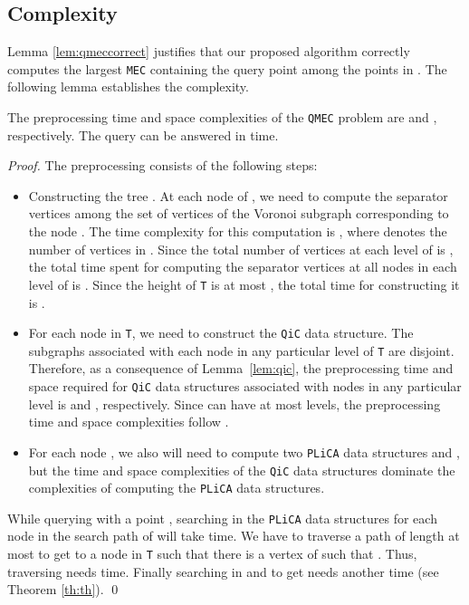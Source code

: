 \documentclass[12pt]{llncs}
\begin{document}
\subsection{Complexity}\label{cc}

Lemma \ref{lem:qmeccorrect} justifies that our proposed algorithm correctly computes 
the 
largest {\tt MEC} containing the query point  among the points in . The 
following 
lemma establishes the  complexity.

\begin{lemma} \label{xxz}
The preprocessing time and space complexities of the {\tt QMEC} problem are  
 and  ,
respectively. The query can be answered in  time.
\end{lemma}
\begin{proof}
The preprocessing consists of the following steps:
\begin{itemize}
\item[] Constructing the tree . At each node  of 
, we need to compute the separator vertices among the set of 
vertices of the Voronoi subgraph  corresponding to the node . 
The time complexity for this computation is , where  
denotes the number of vertices in . Since the total number of 
vertices at each level of  is , the total time spent for 
computing the separator vertices at all nodes in each level of  
is .  Since the height of {\tt T} is at most ,  
the total time for constructing it is .
\item[]  For each node  in {\tt T}, we need to construct the {\tt QiC} data structure. The subgraphs associated with each node in any particular level of {\tt T} are disjoint. Therefore, as a consequence of Lemma\ \ref{lem:qic}, the preprocessing time and space required for {\tt QiC} data structures associated with nodes in any particular level is  and , respectively. Since  can have at most 
 levels, the preprocessing time and space complexities follow .
\item[] For each node , we also will need to compute two  {\tt PLiCA} data structures  and , but the time and space complexities of the {\tt QiC} data structures dominate the complexities of computing the {\tt PLiCA} data structures.
\end{itemize}

While querying with a point ,  searching in the {\tt PLiCA} data 
structures  for each node  in the search path of   will take  time. We  have 
to traverse a path of length at most  to get to a node  in {\tt T} such that  there is a vertex  of 
 such that . Thus, traversing  needs 
 time. Finally searching in  and  to get  needs another 
 time (see Theorem \ref{th:th}). 
\qed
\end{proof}
\end{document}
